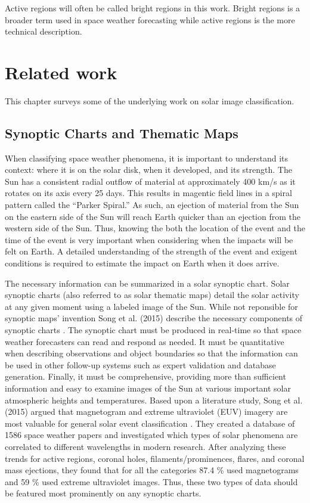 \documentclass[twoside]{report}
\begin{document}
Active regions will often be called bright regions in this work. Bright regions is a broader term used in space weather forecasting while active regions is the more technical description. 

\chapter{Related work} \label{ch:relatedwork}
This chapter surveys some of the underlying work on solar image classification. 

\section{Synoptic Charts and Thematic Maps}
When classifying space weather phenomena, it is important to understand its context: where it is on the solar disk, when it developed, and its strength. The Sun has a consistent radial outflow of material at approximately 400 km/s as it rotates on its axis every 25 days. This results in magentic field lines in a spiral pattern called the ``Parker Spiral.'' As such, an ejection of material from the Sun on the eastern side of the Sun will reach Earth quicker than an ejection from the western side of the Sun.  Thus, knowing the both the location of the event and the time of the event is very important when considering when the impacts will be felt on Earth. A detailed understanding of the strength of the event and exigent conditions is required to estimate the impact on Earth when it does arrive.

The necessary information can be summarized in a solar synoptic chart. Solar synoptic charts (also referred to as solar thematic maps) detail the solar activity at any given moment using a labeled image of the Sun. While not reponsible for synoptic maps' invention Song et al. (2015)  describe the necessary components of synoptic charts \cite{song:2015}. The synoptic chart must be produced in real-time so that space weather forecasters can read and respond as needed. It must be quantitative when describing observations and object boundaries so that the information can be used in other follow-up systems such as expert validation and database generation. Finally, it must be comprehensive, providing more than sufficient information and easy to examine images of the Sun at various important solar atmospheric heights and temperatures. Based upon a literature study, Song et al. (2015) argued that magnetogram and extreme ultraviolet (EUV) imagery are most valuable for general solar event classification \cite{song:2015}. They created a database of 1586 space weather papers and investigated which types of solar phenomena are correlated to different wavelengths in modern research. After analyzing these trends for active regions, coronal holes, filaments/prominences, flares, and coronal mass ejections, they found that for all the categories 87.4 \% used magnetograms and 59 \% used extreme ultraviolet images. Thus, these two types of data should be featured most prominently on any synoptic charts.
\end{document}
